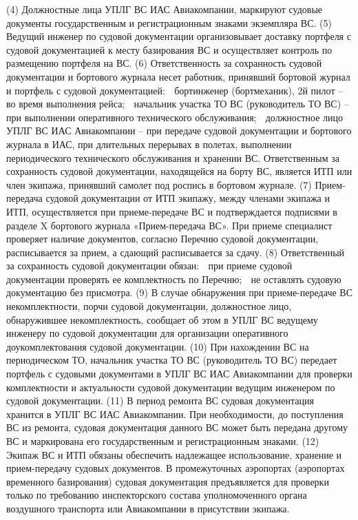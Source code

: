 (4) Должностные лица УПЛГ ВС ИАС Авиакомпании, маркируют судовые документы государственным и регистрационным знаками экземпляра ВС. 
(5) Ведущий инженер по судовой документации организовывает доставку портфеля с судовой документацией к месту базирования ВС и осуществляет контроль по размещению портфеля на ВС.
(6) Ответственность за сохранность судовой документации и бортового журнала несет работник, принявший бортовой журнал и портфель с судовой документацией:
	бортинженер (бортмеханик), 2й пилот – во время выполнения рейса;
	начальник участка ТО ВС (руководитель ТО ВС) – при выполнении оперативного технического обслуживания;
	должностное лицо УПЛГ ВС ИАС Авиакомпании – при передаче судовой документации и бортового журнала в ИАС, при длительных перерывах в полетах, выполнении периодического технического обслуживания и хранении ВС.
Ответственным за сохранность судовой документации, находящейся на борту ВС, является ИТП или член экипажа, принявший самолет под роспись в бортовом журнале. 
(7) Прием-передача судовой документации от ИТП экипажу, между членами экипажа и ИТП, осуществляется при приеме-передаче ВС и подтверждается подписями в разделе X бортового журнала «Прием-передача ВС».
При приеме специалист проверяет наличие документов, согласно Перечню судовой документации, расписывается за прием, а сдающий расписывается за сдачу. 
(8) Ответственный за сохранность судовой документации обязан:
	при приеме судовой документации проверять ее комплектность по Перечню;
	не оставлять судовую документацию без присмотра.
(9) В случае обнаружения при приеме-передаче ВС некомплектности, порчи судовой документации, должностное лицо, обнаружившее некомплектность, сообщает об этом в УПЛГ ВС ведущему инженеру по судовой документации для организации оперативного доукомплектования судовой документации. 
(10) При нахождении ВС на периодическом ТО, начальник участка ТО ВС (руководитель ТО ВС) передает портфель с судовыми документами в УПЛГ ВС ИАС Авиакомпании для проверки комплектности и актуальности судовой документации ведущим инженером по судовой документации.
(11) В период ремонта ВС судовая документация хранится в УПЛГ ВС ИАС Авиакомпании. При необходимости, до поступления ВС из ремонта, судовая документация данного ВС может быть передана другому ВС и маркирована его государственным и регистрационным знаками.  
 (12)	Экипаж ВС и ИТП обязаны обеспечить надлежащее использование, хранение и прием-передачу судовых документов. 
В промежуточных аэропортах (аэропортах временного базирования) судовая документация предъявляется для проверки только по требованию инспекторского состава уполномоченного органа воздушного транспорта или Авиакомпании в присутствии экипажа. 
